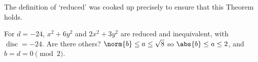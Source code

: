 \documentclass{article}
\DeclareMathOperator{\disc}{disc}
\begin{document}
\begin{remark}
    The definition of `reduced' was cooked up precisely to ensure that this Theorem holds.
\end{remark}

\begin{eg}
    For $d = -24$, $x^2 + 6y^2$ and $2x^2 + 3y^2$ are reduced and inequivalent, with $\disc = -24$.
    Are there others?
    $\norm{b} \leq a \leq \sqrt{8}$ so $\abs{b} \leq a \leq 2$, and $b = d = 0 \pmod{2}$.
\end{eg}
\end{document}
